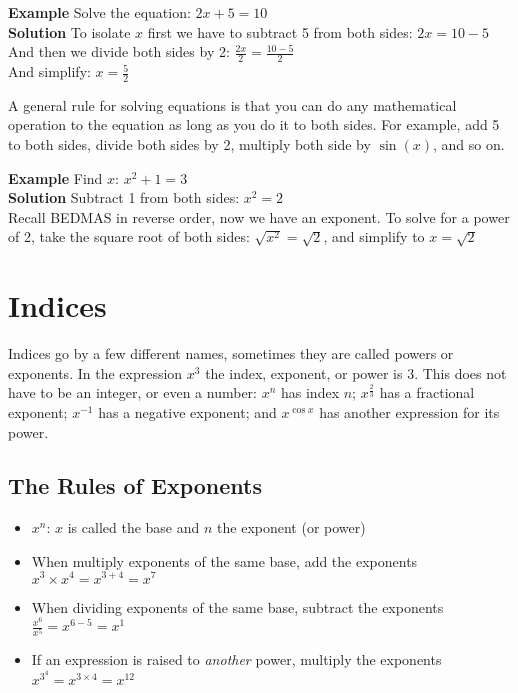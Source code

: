 \textbf{Example} Solve the equation: $2x+5=10$\\
\textbf{Solution} To isolate $x$ first we have to subtract 5 from both sides: $2x=10-5$\\
And then we divide both sides by 2: $\frac{2x}{2}=\frac{10-5}{2}$\\
And simplify: $x=\frac{5}{2}$

\begin{tcolorbox}
A general rule for solving equations is that you can do any mathematical operation to the equation as long as you do it to both sides. For example, add 5 to both sides, divide both sides by 2, multiply both side by $\sin(x)$, and so on.
\end{tcolorbox}

\textbf{Example} Find $x$: $x^2+1=3$\\
\textbf{Solution} Subtract 1 from both sides: $x^2=2$\\
Recall BEDMAS in reverse order, now we have an exponent. To solve for a power of 2, take the square root of both sides: $\sqrt{x^2}=\sqrt{2}$, and simplify to $x=\sqrt{2}$

\section*{Indices}
Indices go by a few different names, sometimes they are called powers or exponents. In the expression $x^3$ the index, exponent, or power is $3$. This does not have to be an integer, or even a number: $x^n$ has index $n$; $x^{\frac{2}{3}}$ has a fractional exponent; $x^{-1}$ has a negative exponent; and $x^{\cos x}$ has another expression for its power.

\subsection*{The Rules of Exponents}
\begin{tcolorbox}
	\begin{itemize}
		\item $x^n$: $x$ is called the base and $n$ the exponent (or power)
		\item When multiply exponents of the same base, add the exponents\\
		$x^3\times x^4=x^{3+4}=x^7$
		\item When dividing exponents of the same base, subtract the exponents\\
		$\frac{x^6}{x^5}=x^{6-5}=x^1$
		\item If an expression is raised to \textit{another} power, multiply the exponents\\
		$x^{3^4}=x^{3\times 4}=x^{12}$
	\end{itemize}
\end{tcolorbox}	

